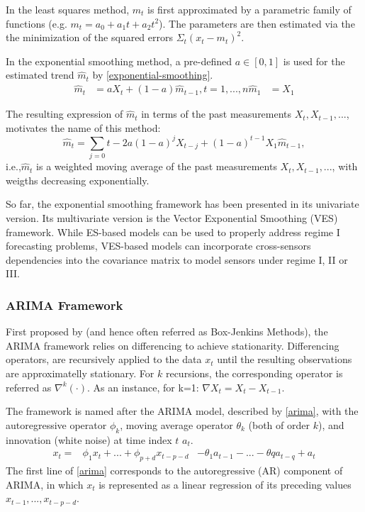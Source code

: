 In the least squares method, $m_t$ is first approximated by a parametric family of functions (e.g. $m_t = a_0 + a_1 t + a_2 t^2$).
The parameters are then estimated via the the minimization of the squared errors $\Sigma_t (x_t - m_t)^2$. 

In the exponential smoothing method, a pre-defined $a \in [0, 1]$ is used for the estimated trend $\hat{m}_t$ by \autoref{exponential-smoothing}.
\begin{align}\label{exponential-smoothing}
    \hat{m}_t &= a X_t + (1-a) \hat{m}_{t-1}, t=1, ..., n
    \hat{m}_1 &= X_1
\end{align}

The resulting expression of $\hat{m}_t$ in terms of the past measurements $X_t, X_{t-1}, ...$, motivates the name of this method:
\begin{equation}\label{exponential-smoothing2}
    \hat{m}_t = \sum_{j=0}{t-2} a (1-a)^j X_{t-j} + (1-a)^{t-1} X_1 \hat{m}_{t-1}, 
\end{equation}
i.e.,$\hat{m}_t$ is a weighted moving average of the past measurements $X_t, X_{t-1}, ...$, with weigths decreasing exponentially.

So far, the exponential smoothing framework has been presented in its univariate version.
Its multivariate version is the Vector Exponential Smoothing (VES) framework.  
While ES-based models can be used to properly address regime I forecasting problems, VES-based models can incorporate cross-sensors dependencies into the covariance matrix to model sensors under regime I, II or III.

\subsubsection{ARIMA Framework}
First proposed by \cite{box1970time} (and hence often referred as Box-Jenkins Methods), the ARIMA framework relies on differencing to achieve stationarity.
Differencing operators, are recursively applied to the data ${x_t}$ until the resulting observations are approximatelly stationary. \cite{brockwell1991methods}
For $k$ recursions, the corresponding operator is referred as $\nabla^k(\cdot)$.
As an instance, for k=1: $\nabla X_t = X_{t} - X_{t-1}$.

The framework is named after the ARIMA model, described by \autoref{arima}, with the autoregressive operator $\phi_k$, moving average operator $\theta_k$ (both of order $k$), and innovation (white noise) at time index $t$ $a_t$.
\begin{align}\label{arima}
    x_t = & \phi_1 x_t + ... + \phi_{p+d} x_{t-p-d}
          & - \theta_{1} a_{t-1} - ... - \theta{q} a_{t-q} + a_t 
\end{align}
The first line of \autoref{arima} corresponds to the autoregressive (AR) component of ARIMA, in which $x_t$ is represented as a linear regression of its preceding values $x_{t-1}, ..., x_{t-p-d}$.

